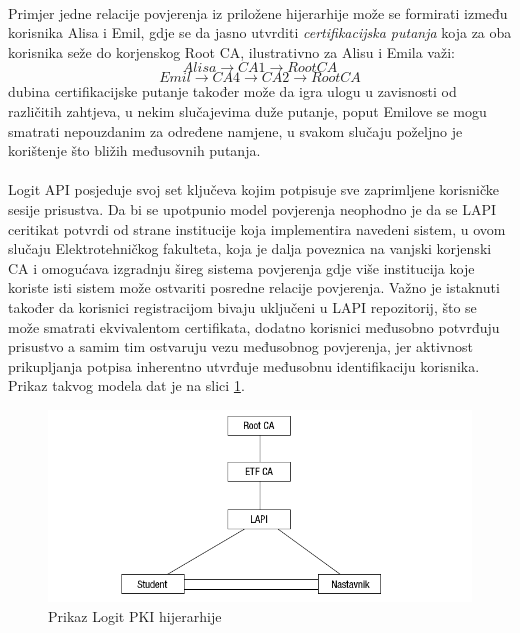 \paragraph*{}
Primjer jedne relacije povjerenja iz priložene hijerarhije može se formirati između korisnika Alisa i Emil, gdje se da jasno utvrditi \textit{certifikacijska putanja} koja za oba korisnika seže do korjenskog Root CA, ilustrativno za Alisu i Emila važi: \[Alisa \to CA1 \to Root CA\] \[Emil \to CA4 \to CA2 \to Root CA\] dubina certifikacijske putanje također može da igra ulogu u zavisnosti od različitih zahtjeva, u nekim slučajevima duže putanje, poput Emilove se mogu smatrati nepouzdanim za određene namjene, u svakom slučaju poželjno je korištenje što bližih međusovnih putanja.

\paragraph*{}
Logit API posjeduje svoj set ključeva kojim potpisuje sve zaprimljene korisničke sesije prisustva. Da bi se upotpunio model povjerenja neophodno je da se LAPI ceritikat potvrdi od strane institucije koja implementira navedeni sistem, u ovom slučaju Elektrotehničkog fakulteta, koja je dalja poveznica na vanjski korjenski CA i omogućava izgradnju šireg sistema povjerenja gdje više institucija koje koriste isti sistem može ostvariti posredne relacije povjerenja. Važno je istaknuti također da korisnici registracijom bivaju uključeni u LAPI repozitorij, što se može smatrati ekvivalentom certifikata, dodatno korisnici međusobno potvrđuju prisustvo a samim tim ostvaruju vezu međusobnog povjerenja, jer aktivnost prikupljanja potpisa inherentno utvrđuje međusobnu identifikaciju korisnika. Prikaz takvog modela dat je na slici \ref{fig:logit_pki}.

\begin{figure}[H]
    \centering
    \includegraphics[width=1.0\textwidth]{material/logit_pki}
    \caption{Prikaz Logit PKI hijerarhije}
    \label{fig:logit_pki}
\end{figure}

